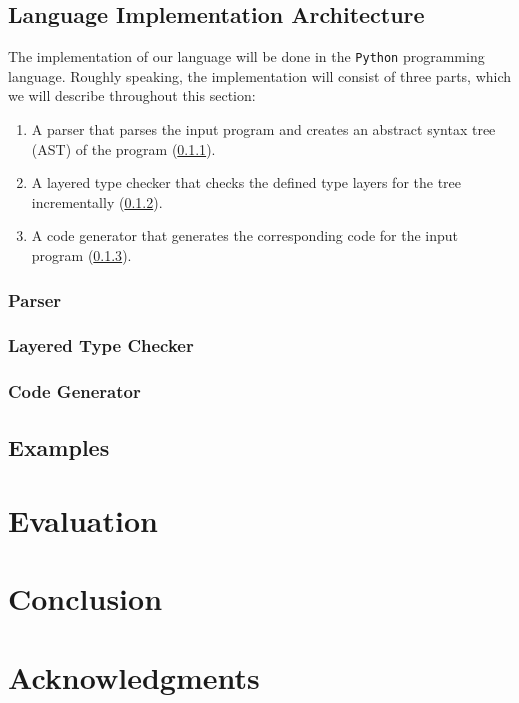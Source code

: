 \documentclass[acmsmall, review, screen]{acmart}
\begin{document}
\subsection{Language Implementation Architecture}
\label{ssec:architecture}

The implementation of our language will be done in the \texttt{Python} programming language. Roughly speaking, the implementation will consist of three parts, which we will describe throughout this section:

\begin{enumerate}
	\item A parser that parses the input program and creates an abstract syntax tree (AST) of the program (\ref{sssec:parser}).
	\item A layered type checker that checks the defined type layers for the tree incrementally (\ref{sssec:layered_type_checker}).
	\item A code generator that generates the corresponding code for the input program (\ref{sssec:code_generator}).
\end{enumerate}

\subsubsection{Parser}
\label{sssec:parser}

\subsubsection{Layered Type Checker}
\label{sssec:layered_type_checker}

\subsubsection{Code Generator}
\label{sssec:code_generator}

\subsection{Examples}
\label{ssec:examples}

\section{Evaluation}
\label{sec:evaluation}
\section{Conclusion}
\label{sec:conclusion}
\section{Acknowledgments}
\label{sec:acknowledgments}
\end{document}
